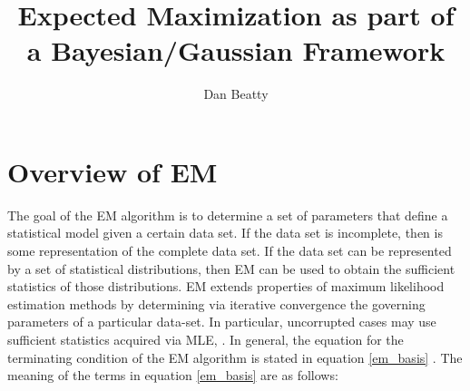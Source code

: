 \documentclass[11pt]{article}
\title{Expected Maximization as part of a Bayesian/Gaussian Framework}
\author{Dan Beatty}
\begin{document}
\maketitle

\section{Overview of EM}
The goal of the EM algorithm is to determine a set of parameters that define a statistical model given a certain data set.   If the data set is incomplete, then is some representation of the complete data set.  If the data set can be represented by a set of statistical distributions,  then EM can be used to obtain the sufficient statistics of those distributions.  %
EM extends properties of maximum likelihood estimation methods by determining via iterative convergence the governing parameters of a particular data-set.   In particular,  uncorrupted cases may use sufficient statistics acquired via MLE,  \cite{duda-hart-stork}.  
In general, the equation for the terminating condition of the EM algorithm \cite{duda-hart-stork} is stated in equation \ref{em_basis} .  The meaning of the terms in equation \ref{em_basis} are as follows:
\end{document}
